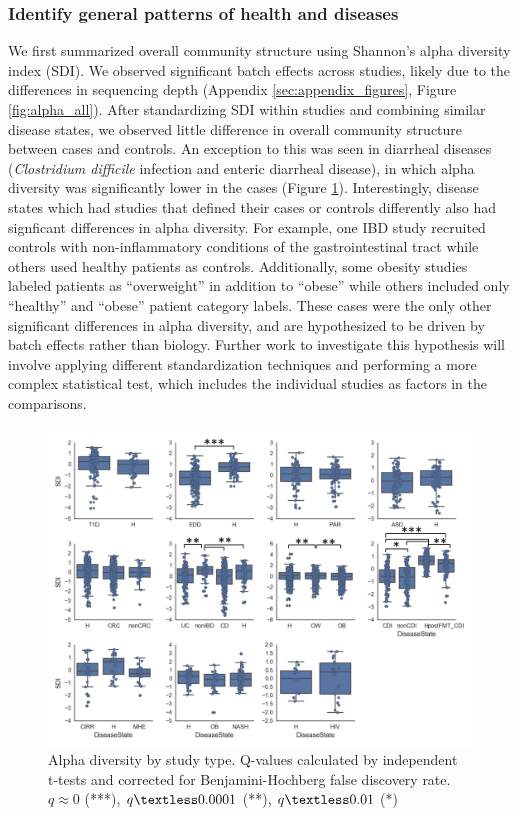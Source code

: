 \documentclass[12pt]{article}
\begin{document}
\subsubsection{Identify general patterns of health and diseases}
We first summarized overall community structure using Shannon's alpha diversity
index (SDI). We observed significant batch effects across studies, likely due to
the differences in sequencing depth (Appendix \ref{sec:appendix_figures}, Figure \ref{fig:alpha_all}). After standardizing SDI within studies
and combining similar disease states, we observed little difference in overall
community structure between cases and controls. An exception to this was seen
in diarrheal diseases (\textit{Clostridium difficile} infection and enteric 
diarrheal disease), in which alpha diversity was significantly lower in the cases (Figure \ref{fig:alpha}). Interestingly, disease states which had studies that defined
their cases or controls differently also had signficant differences
in alpha diversity. For example, one IBD study \cite{ibd-papa} recruited controls
with non-inflammatory conditions of the gastrointestinal tract while others \cite{ibd-gevers, ibd-engstrand, ibd_hut}
used healthy patients as controls. Additionally, some obesity studies \cite{ob-escobar, ob-goodrich, ob-gordon} labeled patients as ``overweight'' in addition
to ``obese'' while others \cite{ob-ross, ob-zupancic} included only ``healthy'' and ``obese'' patient 
category labels. These cases were the only other significant
differences in alpha diversity, and are 
hypothesized to be driven by batch effects rather than biology.
Further work to investigate this hypothesis will involve applying 
different standardization techniques and performing a more complex 
statistical test, which includes the individual studies as factors
in the comparisons.

\begin{figure}
\begin{center}
	\includegraphics[scale=0.55]{alpha_diversity_by_study_type}
	\caption{Alpha diversity by study type. Q-values calculated by independent t-tests and corrected for Benjamini-Hochberg false discovery rate. $q \approx 0$ (***), $q \textless 0.0001$ (**), $q \textless 0.01$ (*)}	\label{fig:alpha}
\end{center}
\end{figure}
\end{document}

